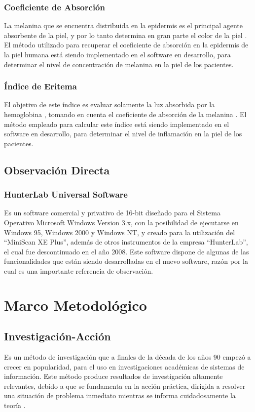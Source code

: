 \documentclass[conference]{IEEEtran}
\begin{document}
		\subsubsection{Coeficiente de Absorci\'{o}n}
			La melanina que se encuentra distribuida en la epidermis es el  principal agente absorbente de la piel, y por lo tanto determina en gran parte el 
color de la piel \cite{Narea}. El m\'{e}todo utilizado para recuperar el coeficiente de absorci\'{o}n en la epidermis de la piel humana \cite{Narea} est\'{a} siendo implementado en el software en desarrollo, para determinar el nivel de concentraci\'{o}n de melanina en la piel de los pacientes.
		
		\subsubsection{\'{I}ndice de Eritema}
			El objetivo de este \'{i}ndice es evaluar solamente la luz absorbida por la hemoglobina \cite{Bersha}, tomando en cuenta el coeficiente de absorci\'{o}n de la melanina \cite{Narea}. El m\'{e}todo empleado para calcular este \'{i}ndice \cite{Bersha} est\'{a} siendo implementado en el software en desarrollo, para determinar el nivel de inflamaci\'{o}n en la piel de los pacientes.
	
	\subsection{Observaci\'{o}n Directa}		
		\subsubsection{HunterLab Universal Software}
			Es un software comercial y privativo de 16-bit dise\~{n}ado para el Sistema Operativo Microsoft Windows Version 3.x, con la posibilidad de ejecutarse en Windows 95, Windows 2000 y Windows NT, y creado para la utilizaci\'{o}n del ``MiniScan XE Plus'', adem\'{a}s de otros instrumentos de la empresa ``HunterLab''\cite{HunterLab-manual}, el cual fue descontinuado en el a\~{n}o 2008. Este software dispone de algunas de las funcionalidades que est\'{a}n siendo desarrolladas en el nuevo software, raz\'{o}n por la cual es una importante referencia de observaci\'{o}n.

\section{Marco Metodol\'{o}gico}

	\subsection{Investigaci\'{o}n-Acci\'{o}n}
		Es un m\'{e}todo de investigaci\'{o}n que a finales de la d\'{e}cada de los a\~{n}os 90 empez\'{o} a crecer en popularidad, para el uso en investigaciones acad\'{e}micas de sistemas de informaci\'{o}n. Este m\'{e}todo produce resultados de investigaci\'{o}n altamente relevantes, debido a que se fundamenta en la acci\'{o}n pr\'{a}ctica, dirigida a resolver una situaci\'{o}n de problema inmediato mientras se informa cuidadosamente la teor\'{i}a \cite{Baskerville}.
		
\end{document}
